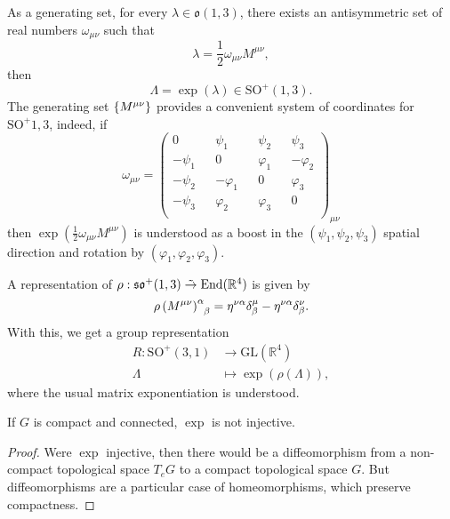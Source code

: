 \begin{example}
    As a generating set, for every \(\lambda \in \mathfrak{o}(1,3)\), there exists an antisymmetric set of real numbers \(\omega_{\mu\nu}\) such that
    \begin{equation*}
        \lambda = \frac12\omega_{\mu\nu}M^{\mu\nu},
    \end{equation*}
    then
    \begin{equation*}
        \Lambda = \exp(\lambda) \in \mathrm{SO}^+(1,3).
    \end{equation*}
    The generating set \(\{M^{\mu\nu}\}\) provides a convenient system of coordinates for \(\mathrm{SO}^+{1,3}\), indeed, if
    \begin{equation*}
        \omega_{\mu\nu} = \begin{pmatrix}
            0       && \psi_1       && \psi_2       && \psi_3\\
            -\psi_1 && 0            && \varphi_1    && -\varphi_2\\
            -\psi_2 && -\varphi_1   && 0            && \varphi_3\\
            -\psi_3 && \varphi_2    && \varphi_3    && 0\\
        \end{pmatrix}_{\mu\nu}
    \end{equation*}
    then \(\exp\left(\frac12 \omega_{\mu\nu}M^{\mu\nu}\right)\) is understood as a boost in the \((\psi_1, \psi_2, \psi_3)\) spatial direction and rotation by \((\varphi_1, \varphi_2, \varphi_3)\).

    A representation of \(\rho : \mathfrak{so}^+(1,3) \mathrel{\tilde{\to}} \operatorname{End}(\mathbb{R}^4)\) is given by
    \begin{equation*}
        \rho\left(M^{\mu\nu}\right)\indices{^\alpha_{\beta}} = \eta^{\nu \alpha}\delta^\mu_{\beta} - \eta^{\nu \alpha}\delta^\nu_{\beta}.
    \end{equation*}
    With this, we get a group representation
    \begin{align*}
        R : \mathrm{SO}^+(3,1) &\to \mathrm{GL}(\mathbb{R}^4)\\
                       \Lambda &\mapsto \exp\left(\rho(\Lambda)\right),
    \end{align*}
    where the usual matrix exponentiation is understood.
\end{example}

\begin{corollary}
    If \(G\) is compact and connected, \(\exp\) is not injective.
\end{corollary}
\begin{proof}
    Were \(\exp\) injective, then there would be a diffeomorphism from a non-compact topological space \(T_eG\) to a compact topological space \(G\). But diffeomorphisms are a particular case of homeomorphisms, which preserve compactness.
\end{proof}

